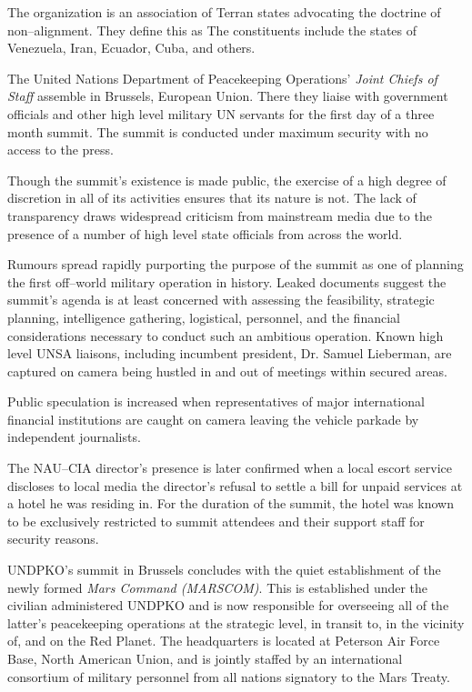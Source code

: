 The organization is an association of Terran states advocating the doctrine of non--alignment. They define this as  The constituents include the states of Venezuela, Iran, Ecuador, Cuba, and others.
\StopTimelineDate

The United Nations Department of Peacekeeping Operations' {\it Joint Chiefs of Staff} assemble in Brussels, European Union. There they liaise with government officials and other high level military UN servants for the first day of a three month summit. The summit is conducted under maximum security with no access to the press. 

Though the summit's existence is made public, the exercise of a high degree of discretion in all of its activities ensures that its nature is not. The lack of transparency draws widespread criticism from mainstream media due to the presence of a number of high level state officials from across the world.

Rumours spread rapidly purporting the purpose of the summit as one of planning the first off--world military operation in history. Leaked documents suggest the summit's agenda is at least concerned with assessing the feasibility, strategic planning, intelligence gathering, logistical, personnel, and the financial considerations necessary to conduct such an ambitious operation. Known high level UNSA liaisons, including incumbent president, Dr. Samuel Lieberman, are captured on camera being hustled in and out of meetings within secured areas.

Public speculation is increased when representatives of major international financial institutions are caught on camera leaving the vehicle parkade by independent journalists. 

The NAU--CIA director's presence is later confirmed when a local escort service discloses to local media the director's refusal to settle a bill for unpaid services at a hotel he was residing in. For the duration of the summit, the hotel was known to be exclusively restricted to summit attendees and their support staff for security reasons.
\StopTimelineDate

UNDPKO's summit in Brussels concludes with the quiet establishment of the newly formed {\it Mars Command (MARSCOM)}. This is established under the civilian administered UNDPKO and is now responsible for overseeing all of the latter's peacekeeping operations at the strategic level, in transit to, in the vicinity of, and on the Red Planet. The headquarters is located at Peterson Air Force Base, North American Union, and is jointly staffed by an international consortium of military personnel from all nations signatory to the Mars Treaty.

